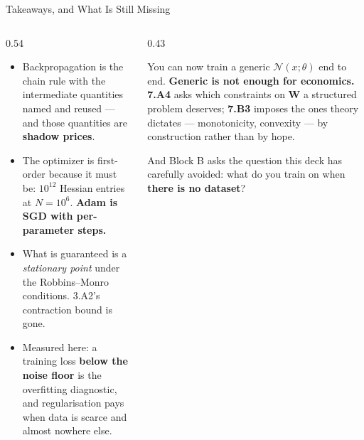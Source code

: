 \begin{frame}{Takeaways, and What Is Still Missing}
\begin{columns}[T]
\begin{column}{0.54\textwidth}
\begin{takeawaybox}\small
\begin{itemize}\small\setlength{\itemsep}{1.1mm}
  \item Backpropagation is the chain rule with the intermediate quantities named and reused --- and those quantities are \textbf{shadow prices}.
  \item The optimizer is first-order because it must be: $10^{12}$ Hessian entries at $N=10^{6}$. \textbf{Adam is SGD with per-parameter steps.}
  \item What is guaranteed is a \emph{stationary point} under the Robbins--Monro conditions. 3.A2's contraction bound is gone.
  \item Measured here: a training loss \textbf{below the noise floor} is the overfitting diagnostic, and regularisation pays when data is scarce and almost nowhere else.
\end{itemize}
\end{takeawaybox}
\end{column}
\begin{column}{0.43\textwidth}
\begin{conceptbox}[title=\textbf{Bridge}]\small
You can now train a generic $\mathcal{N}(x;\theta)$ end to end. \textbf{Generic is not enough for economics.}
\medskip
\textbf{7.A4} asks which constraints on $\mathbf{W}$ a structured problem deserves; \textbf{7.B3} imposes the ones theory dictates --- monotonicity, convexity --- by construction rather than by hope.
\end{conceptbox}
\medskip
\begin{examplebox}\footnotesize
And Block B asks the question this deck has carefully avoided: what do you train on when \textbf{there is no dataset}?
\end{examplebox}
\end{column}
\end{columns}
\end{frame}


